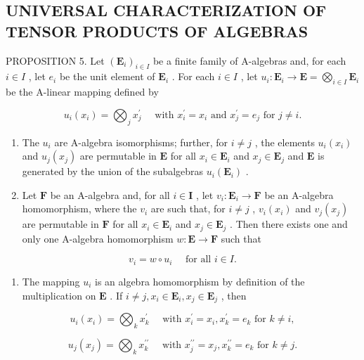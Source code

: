 \subsection{UNIVERSAL CHARACTERIZATION OF TENSOR PRODUCTS OF ALGEBRAS}

PROPOSITION 5. Let \((\mathbf{E}_i)_{i\in I}\) be a finite family of A-algebras and, for each \(i\in I\) , let \(e_i\) be the unit element of \(\mathbf{E}_i\) . For each \(i\in I\) , let \(u_i: \mathbf{E}_i \to \mathbf{E} = \bigotimes_{i\in I} \mathbf{E}_i\) be the A-linear mapping defined by

\[
u _ {i} (x _ {i}) = \bigotimes_ {j} x _ {j} ^ {\prime} \quad \text { with } x _ {i} ^ {\prime} = x _ {i} \text { and } x _ {j} ^ {\prime} = e _ {j} \text { for } j \neq i.
\]

\begin{enumerate}
\def\labelenumi{(\roman{enumi})}
\item
  The \(u_{i}\) are A-algebra isomorphisms; further, for \(i \neq j\) , the elements \(u_{i}(x_{i})\) and \(u_{j}(x_{j})\) are permutable in \(\mathbf{E}\) for all \(x_{i} \in \mathbf{E}_{i}\) and \(x_{j} \in \mathbf{E}_{j}\) and \(\mathbf{E}\) is generated by the union of the subalgebras \(u_{i}(\mathbf{E}_{i})\) .
\item
  Let \(\mathbf{F}\) be an A-algebra and, for all \(i \in \mathbf{I}\) , let \(v_i: \mathbf{E}_i \to \mathbf{F}\) be an A-algebra homomorphism, where the \(v_i\) are such that, for \(i \neq j\) , \(v_i(x_i)\) and \(v_j(x_j)\) are permutable in \(\mathbf{F}\) for all \(x_i \in \mathbf{E}_i\) and \(x_j \in \mathbf{E}_j\) . Then there exists one and only one A-algebra homomorphism \(w: \mathbf{E} \to \mathbf{F}\) such that
\end{enumerate}

\[
v _ {i} = w \circ u _ {i} \quad \text { for all } i \in I.\tag{4}
\]

\begin{enumerate}
\def\labelenumi{(\roman{enumi})}
\tightlist
\item
  The mapping \(u_{i}\) is an algebra homomorphism by definition of the multiplication on \(\mathbf{E}\) . If \(i \neq j, x_{i} \in \mathbf{E}_{i}, x_{j} \in \mathbf{E}_{j}\) , then
\end{enumerate}

\[
u _ {i} (x _ {i}) = \bigotimes_ {k} x _ {k} ^ {\prime} \quad \text { with } x _ {i} ^ {\prime} = x _ {i}, x _ {k} ^ {\prime} = e _ {k} \text { for } k \neq i,
\]

\[
u _ {j} (x _ {j}) = \bigotimes_ {k} x _ {k} ^ {\prime \prime} \quad \text { with } x _ {j} ^ {\prime \prime} = x _ {j}, x _ {k} ^ {\prime \prime} = e _ {k} \text { for } k \neq j.
\]

